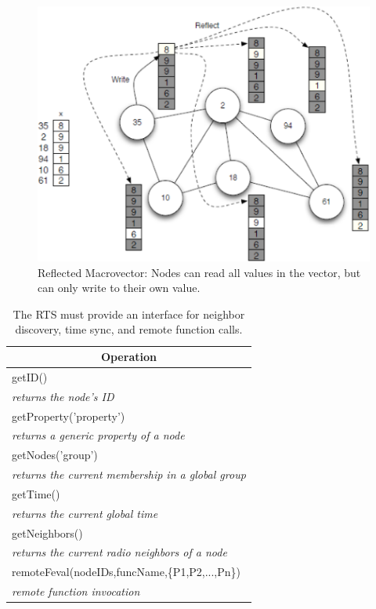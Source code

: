 \begin{figure}
  \centering
  \includegraphics[width=0.8\columnwidth]{fig/ReflectedArray.eps}
  \caption[Reflected Macrovector]{Reflected Macrovector: Nodes can read all values in the vector, but can only write to their own value.}
  \label{fig:reflectedVector}
\end{figure}

\begin{table}
  \centering
   \begin{tabular}{| l |}
     \hline
     \multicolumn{1}{|c|}{Operation} \\
     \hline
     getID() \\
     \textit{returns the node's ID}\\
     \hline
     getProperty('property') \\
     \textit{returns a generic property of a node} \\
     \hline
     getNodes('group') \\
     \textit{returns the current membership in a global group}\\
     \hline
     getTime() \\
     \textit{returns the current global time} \\
     \hline
     getNeighbors() \\
     \textit{returns the current radio neighbors of a node}\\
     \hline
     remoteFeval(nodeIDs,funcName,\{P1,P2,...,Pn\}) \\
     \textit{remote function invocation}\\
     \hline
   \end{tabular}
   \caption[Functions supported by the Run-Time System]{The RTS must provide an interface for
   neighbor discovery, time sync, and remote function calls.}
   \label{table:lib}
\end{table}

